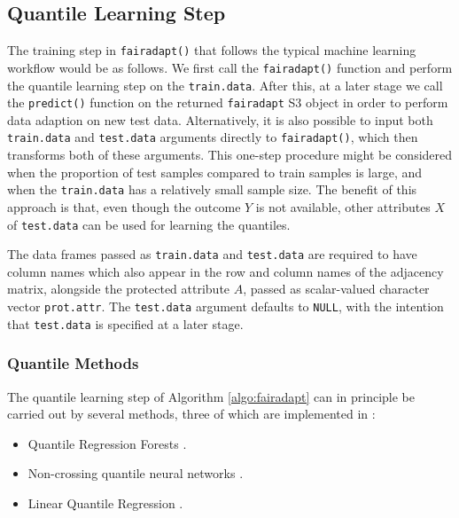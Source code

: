\documentclass[
  nojss]{jss}
\providecommand{\tightlist}{%
  \setlength{\itemsep}{0pt}\setlength{\parskip}{0pt}}
\begin{document}
\hypertarget{quantile-learning-step}{%
\subsection{Quantile Learning Step}\label{quantile-learning-step}}

The training step in \texttt{fairadapt()} that follows the typical
machine learning workflow would be as follows. We first call the
\texttt{fairadapt()} function and perform the quantile learning step on
the \texttt{train.data}. After this, at a later stage we call the
\texttt{predict()} function on the returned \texttt{fairadapt} S3 object
in order to perform data adaption on new test data. Alternatively, it is
also possible to input both \texttt{train.data} and \texttt{test.data}
arguments directly to \texttt{fairadapt()}, which then transforms both
of these arguments. This one-step procedure might be considered when the
proportion of test samples compared to train samples is large, and when
the \texttt{train.data} has a relatively small sample size. The benefit
of this approach is that, even though the outcome \(Y\) is not
available, other attributes \(X\) of \texttt{test.data} can be used for
learning the quantiles.

The data frames passed as \texttt{train.data} and \texttt{test.data} are
required to have column names which also appear in the row and column
names of the adjacency matrix, alongside the protected attribute \(A\),
passed as scalar-valued character vector \texttt{prot.attr}. The
\texttt{test.data} argument defaults to \texttt{NULL}, with the
intention that \texttt{test.data} is specified at a later stage.

\hypertarget{quantile-methods}{%
\subsubsection{Quantile Methods}\label{quantile-methods}}

The quantile learning step of Algorithm \ref{algo:fairadapt} can in
principle be carried out by several methods, three of which are
implemented in :

\begin{itemize}
\tightlist
\item
  Quantile Regression Forests
  \citep{meinshausen2006qrf, wright2015ranger}.
\item
  Non-crossing quantile neural networks
  \citep{cannon2018non, cannon2015package}.
\item
  Linear Quantile Regression \citep{koenker2001qr, koenker2018package}.
\end{itemize}
\end{document}
